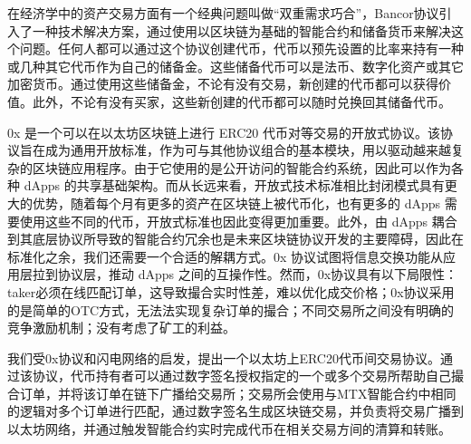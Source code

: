\documentclass[UTF8,nofonts]{ctexart}
\begin{document}
在经济学中的资产交易方面有一个经典问题叫做“双重需求巧合”，Bancor协议引入了一种技术解决方案，通过使用以区块链为基础的智能合约和储备货币来解决这个问题。任何人都可以通过这个协议创建代币，代币以预先设置的比率来持有一种或几种其它代币作为自己的储备金。这些储备代币可以是法币、数字化资产或其它加密货币。通过使用这些储备金，不论有没有交易，新创建的代币都可以获得价值。此外，不论有没有买家，这些新创建的代币都可以随时兑换回其储备代币。


0x \cite{warren20170x} 是一个可以在以太坊区块链上进行 ERC20 代币对等交易的开放式协议。该协议旨在成为通用开放标准，作为可与其他协议组合的基本模块，用以驱动越来越复杂的区块链应用程序。由于它使用的是公开访问的智能合约系统，因此可以作为各种 dApps 的共享基础架构。而从长远来看，开放式技术标准相比封闭模式具有更大的优势，随着每个月有更多的资产在区块链上被代币化，也有更多的 dApps 需要使用这些不同的代币，开放式标准也因此变得更加重要。此外，由 dApps 耦合到其底层协议所导致的智能合约冗余也是未来区块链协议开发的主要障碍，因此在标准化之余，我们还需要一个合适的解耦方式。0x 协议试图将信息交换功能从应用层拉到协议层，推动 dApps 之间的互操作性。然而，0x协议具有以下局限性：taker必须在线匹配订单，这导致撮合实时性差，难以优化成交价格；0x协议采用的是简单的OTC方式，无法法实现复杂订单的撮合；不同交易所之间没有明确的竞争激励机制；没有考虑了矿工的利益。


%
%
%

我们受0x协议和闪电网络的启发，提出一个以太坊上ERC20代币间交易协议。通过该协议，代币持有者可以通过数字签名授权指定的一个或多个交易所帮助自己撮合订单，并将该订单在链下广播给交易所；交易所会使用与MTX智能合约中相同的逻辑对多个订单进行匹配，通过数字签名生成区块链交易，并负责将交易广播到以太坊网络，并通过触发智能合约实时完成代币在相关交易方间的清算和转账。
\end{document}
